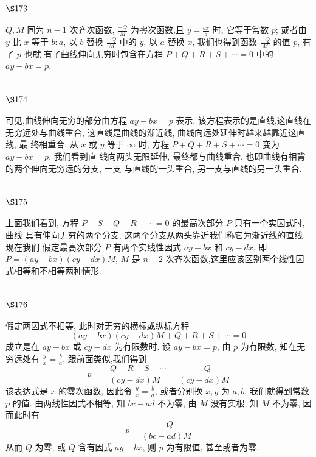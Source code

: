 \section{$\S 173$}

$Q, M$ 同为 $n-1$ 次齐次函数, $\frac{-Q}{M}$ 为零次函数,且 $y=\frac{b x}{a}$ 时, 它等于常数 $p$; 或者由 $y$ 比 $x$ 等于 $b: a$, 以 $b$ 替换 $\frac{-Q}{M}$ 中的 $y$, 以 $a$ 替换 $x$, 我们也得到函数 $\frac{-Q}{M}$ 的值 $p$, 有了 $p$ 也就 有了曲线伸向无穷时包含在方程 $P+Q+R+S+\cdots=0$ 中的 $a y-b x=p$.

\section{$\S 174$}

可见,曲线伸向无穷的部分由方程 $a y-b x=p$ 表示. 该方程表示的是直线,这直线在 无穷远处与曲线重合, 这直线是曲线的渐近线, 曲线向远处延伸时越来越靠近这直线, 最 终相重合. 从 $x$ 或 $y$ 等于 $\infty$ 时, 方程 $P+Q+R+S+\cdots=0$ 变为 $a y-b x=p$, 我们看到直 线向两头无限延伸, 最终都与曲线重合, 也即曲线有相背的两个伸向无穷远的分支, 一支 与直线的一头重合, 另一支与直线的另一头重合.

\section{$\S 175$}

上面我们看到, 方程 $P+S+Q+R+\cdots=0$ 的最高次部分 $P$ 只有一个实因式时, 曲线 具有伸向无穷的两个分支, 这两个分支从两头靠近我们称它为渐近线的直线. 现在我们 假定最高次部分 $P$ 有两个实线性因式 $a y-b x$ 和 $c y-d x$, 即 $P=(a y-b x)(c y-d x) M$, $M$ 是 $n-2$ 次齐次函数,这里应该区别两个线性因式相等和不相等两种情形.

\section{$\S 176$}

假定两因式不相等, 此时对无穷的横标或纵标方程
\[
(a y-b x)(c y-d x) M+Q+R+S+\cdots=0
\]
成立是在 $a y-b x$ 或 $c y-d x$ 为有限数时. 设 $a y-b x=p$, 由 $p$ 为有限数, 知在无穷远处有 $\frac{y}{x}=\frac{b}{a}$, 跟前面类似,我们得到
\[
p=\frac{-Q-R-S-\cdots}{(c y-d x) M}=\frac{-Q}{(c y-d x) M}
\]
该表达式是 $x$ 的零次函数, 因此令 $\frac{y}{x}=\frac{b}{a}$, 或者分别换 $x, y$ 为 $a, b$, 我们就得到常数 $p$ 的值. 由两线性因式不相等, 知 $b c-a d$ 不为零, 由 $M$ 没有实根, 知 $M$ 不为零, 因而此时有
\[
p=\frac{-Q}{(b c-a d) M}
\]
从而 $Q$ 为零, 或 $Q$ 含有因式 $a y-b x$, 则 $p$ 为有限值, 甚至或者为零.

